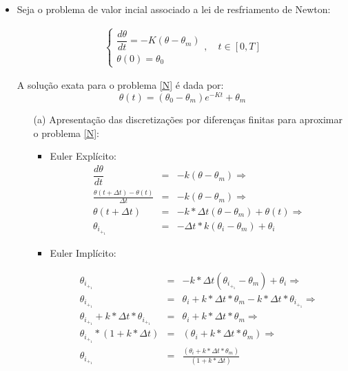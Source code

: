 \documentclass{article}
\newcounter{execs}
\newcommand{\exec}[0]{\addtocounter{execs}{1}\item[\textbf{\arabic{execs}.}]}
\begin{document}
\thispagestyle{first}

\begin{itemize}

\exec Seja o problema de valor incial associado a lei de resfriamento de Newton:

\begin{eqnarray} \label{N}
\begin{cases}

\dfrac{d \theta}{d t} = -K(\theta - \theta_m)\\ 
\theta(0) = \theta_0

\end{cases}, 
\quad t\in [0,T]
\end{eqnarray}

A solução exata para o problema \eqref{N} é dada por:
\begin{equation}\label{solexatN}
\theta(t) = (\theta_0 - \theta_m) e^{-Kt} + \theta_m
\end{equation}

\begin{itemize}
\item[(a)] Apresentação das discretizações por diferenças finitas para aproximar o problema \eqref{N}:
\begin{itemize}

\item Euler Explícito:
\begin{eqnarray}
    \dfrac{d \theta}{d t} &=& -k(\theta - \theta_m)
    \Rightarrow \\ 
    \frac{\theta(t  + \Delta t) - \theta(t)}{\Delta t} &=&  -k(\theta - \theta_m)
    \Rightarrow \\ 
    \theta (t + \Delta t) &=& -k * \Delta t (\theta - \theta_m) + \theta (t)
    \Rightarrow \\  
     \theta_i_+_1 &=& -\Delta t*k(\theta_i - \theta_m) + \theta_i
 \end{eqnarray}
	

\item Euler Implícito:

\begin{eqnarray}
\theta_i_+_1 &=& -k*\Delta t (\theta_i_+_1 - \theta_m) + \theta_i 
\Rightarrow \\
\theta_i_+_1 &=& \theta_i  + k* \Delta t*\theta_m  - k*\Delta t *\theta_i_+_1
\Rightarrow \\ 
\theta_i_+_1 + k*\Delta t*\theta_i_+_1 &=& \theta_i + k *\Delta t *\theta_m
\Rightarrow \\
\theta_i_+_1 * (1+k* \Delta t) &=& (\theta_i + k * \Delta t * \theta_m)
\Rightarrow \\
\theta_i_+_1 &=& \frac{(\theta_i + k * \Delta t * \theta_m)}{(1 + k* \Delta t)} \\
\end{eqnarray}


\end{itemize}
\end{itemize}
\end{itemize}
\end{document}
